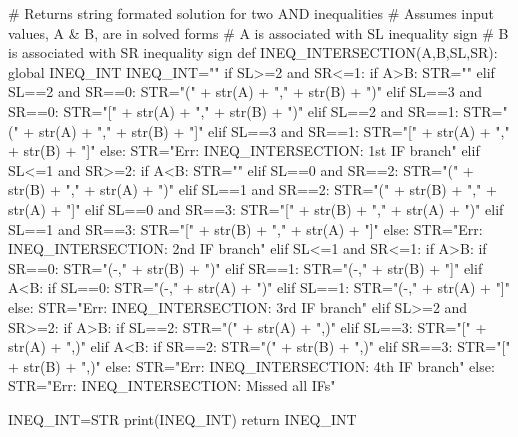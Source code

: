 \documentclass{article}%
\begin{document}
\begin{sagesilent}
    
# Returns string formated solution for two AND inequalities  
# Assumes input values, A & B, are in solved forms
# A is associated with SL inequality sign 
# B is associated with SR inequality sign 
def INEQ_INTERSECTION(A,B,SL,SR):
  global INEQ_INT
  INEQ_INT=""
  if SL>=2 and SR<=1:
    if A>B: STR="\emptyset"
    elif SL==2 and SR==0:   STR="(" + str(A) + "," + str(B) + ")"
    elif SL==3 and SR==0:   STR="[" + str(A) + "," + str(B) + ")"
    elif SL==2 and SR==1:   STR="(" + str(A) + "," + str(B) + "]"
    elif SL==3 and SR==1:   STR="[" + str(A) + "," + str(B) + "]"
    else: STR="Err: INEQ_INTERSECTION: 1st IF branch"   
  elif SL<=1 and SR>=2:
    if A<B: STR="\emptyset"
    elif SL==0 and SR==2:   STR="(" + str(B) + "," + str(A) + ")" 
    elif SL==1 and SR==2:   STR="(" + str(B) + "," + str(A) + "]"
    elif SL==0 and SR==3:   STR="[" + str(B) + "," + str(A) + ")"
    elif SL==1 and SR==3:   STR="[" + str(B) + "," + str(A) + "]"    
    else: STR="Err: INEQ_INTERSECTION: 2nd IF branch"   
  elif SL<=1 and SR<=1:
    if A>B:
      if SR==0:   STR="(-\infty," + str(B) + ")"
      elif SR==1:   STR="(-\infty," + str(B) + "]"
    elif A<B:
      if SL==0:   STR="(-\infty," + str(A) + ")"
      elif SL==1:   STR="(-\infty," + str(A) + "]"      
    else: STR="Err: INEQ_INTERSECTION: 3rd IF branch"  
  elif SL>=2 and SR>=2:
    if A>B:
      if SL==2:     STR="(" + str(A) + ",\infty)"
      elif SL==3:   STR="[" + str(A) + ",\infty)"
    elif A<B:
      if SR==2:     STR="(" + str(B) + ",\infty)"
      elif SR==3:   STR="[" + str(B) + ",\infty)"
    else: STR="Err: INEQ_INTERSECTION: 4th IF branch"
  else:
    STR="Err: INEQ_INTERSECTION: Missed all IFs"
    
  INEQ_INT=STR
  print(INEQ_INT)
  return INEQ_INT


\end{sagesilent}
\end{document}
